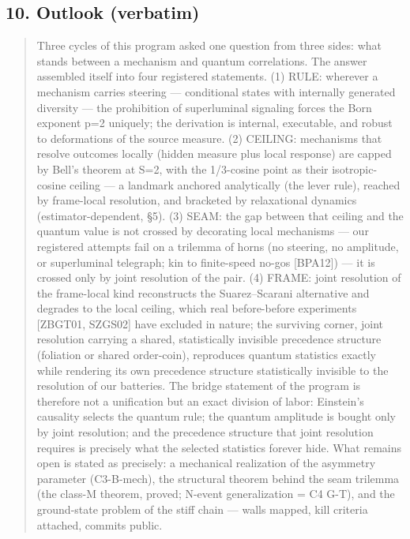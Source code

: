 \documentclass[
  11pt]{article}
\begin{document}
\subsection{10. Outlook (verbatim)}\label{outlook-verbatim}

\begin{quote}
Three cycles of this program asked one question from three sides: what
stands between a mechanism and quantum correlations. The answer
assembled itself into four registered statements. (1) RULE: wherever a
mechanism carries steering --- conditional states with internally
generated diversity --- the prohibition of superluminal signaling forces
the Born exponent p=2 uniquely; the derivation is internal, executable,
and robust to deformations of the source measure. (2) CEILING:
mechanisms that resolve outcomes locally (hidden measure plus local
response) are capped by Bell's theorem at S=2, with the 1/3-cosine point
as their isotropic-cosine ceiling --- a landmark anchored analytically
(the lever rule), reached by frame-local resolution, and bracketed by
relaxational dynamics (estimator-dependent, §5). (3) SEAM: the gap
between that ceiling and the quantum value is not crossed by decorating
local mechanisms --- our registered attempts fail on a trilemma of horns
(no steering, no amplitude, or superluminal telegraph; kin to
finite-speed no-gos {[}BPA12{]}) --- it is crossed only by joint
resolution of the pair. (4) FRAME: joint resolution of the frame-local
kind reconstructs the Suarez--Scarani alternative and degrades to the
local ceiling, which real before-before experiments {[}ZBGT01, SZGS02{]}
have excluded in nature; the surviving corner, joint resolution carrying
a shared, statistically invisible precedence structure (foliation or
shared order-coin), reproduces quantum statistics exactly while
rendering its own precedence structure statistically invisible to the
resolution of our batteries. The bridge statement of the program is
therefore not a unification but an exact division of labor: Einstein's
causality selects the quantum rule; the quantum amplitude is bought only
by joint resolution; and the precedence structure that joint resolution
requires is precisely what the selected statistics forever hide. What
remains open is stated as precisely: a mechanical realization of the
asymmetry parameter (C3-B-mech), the structural theorem behind the seam
trilemma (the class-M theorem, proved; N-event generalization = C4 G-T),
and the ground-state problem of the stiff chain --- walls mapped, kill
criteria attached, commits public.
\end{quote}
\end{document}
